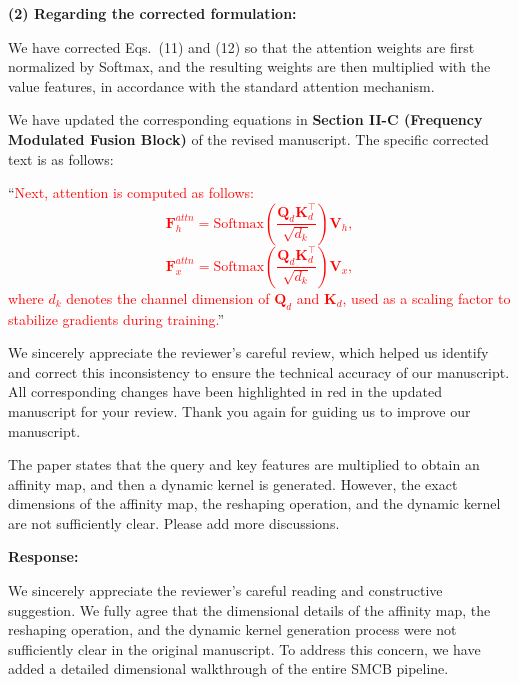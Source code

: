 \textbf{(2) Regarding the corrected formulation:}

We have corrected Eqs.~(11) and (12) so that the attention weights are first normalized by Softmax, and the resulting weights are then multiplied with the value features, in accordance with the standard attention mechanism.

We have updated the corresponding equations in \textbf{Section II-C (Frequency Modulated Fusion Block)} of the revised manuscript. The specific corrected text is as follows:

``\textcolor{red}{Next, attention is computed as follows:
\begin{equation}
 \mathbf{F}^{attn}_{h} = \mathrm{Softmax}\left(
 \frac{\mathbf{Q}_d \mathbf{K}_d^{\top}}{\sqrt{d_k}}
 \right)\mathbf{V}_h,
\end{equation}
\begin{equation}
 \mathbf{F}^{attn}_{x} = \mathrm{Softmax}\left(
 \frac{\mathbf{Q}_d \mathbf{K}_d^{\top}}{\sqrt{d_k}}
 \right)\mathbf{V}_x,
\end{equation}
where $d_k$ denotes the channel dimension of $\mathbf{Q}_d$ and $\mathbf{K}_d$, used as a scaling factor to stabilize gradients during training.}''

We sincerely appreciate the reviewer's careful review, which helped us identify and correct this inconsistency to ensure the technical accuracy of our manuscript. All corresponding changes have been highlighted in red in the updated manuscript for your review. Thank you again for guiding us to improve our manuscript.

\vspace{2em}

\begin{tcolorbox}[title={Reviewer \#1, Comment \#4}] 
  \vspace{1em}
  
  \color{blue}
  The paper states that the query and key features are multiplied to obtain an affinity map, and then a dynamic kernel is generated. However, the exact dimensions of the affinity map, the reshaping operation, and the dynamic kernel are not sufficiently clear. Please add more discussions.

  \vspace{1em}
\end{tcolorbox}

\textbf{Response:}

We sincerely appreciate the reviewer's careful reading and constructive suggestion. We fully agree that the dimensional details of the affinity map, the reshaping operation, and the dynamic kernel generation process were not sufficiently clear in the original manuscript. To address this concern, we have added a detailed dimensional walkthrough of the entire SMCB pipeline.

